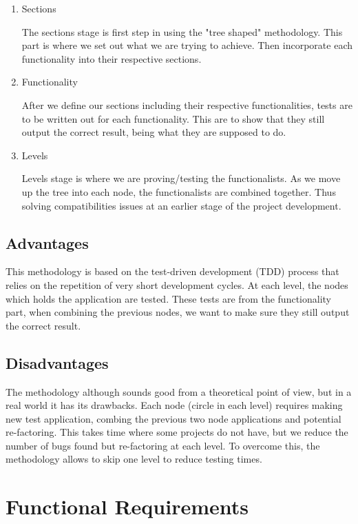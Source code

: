 \begin{enumerate}
  \item Sections
  
    The sections stage is first step in using the "tree shaped" methodology. This part is where we set out what we are trying to achieve. Then incorporate each functionality into their respective sections.
    
  \item Functionality   
    
     After we define our sections including their respective functionalities, tests are to be written out for each functionality. This are to show that they still output the correct result, being what they are supposed to do.
    
  \item Levels
  
    Levels stage is where we are proving/testing the functionalists. As we move up the tree into each node, the functionalists are combined together. Thus solving compatibilities issues at an earlier stage of the project development.
\end{enumerate}

\subsection{Advantages}

This methodology is based on the test-driven development (TDD) process that relies on the repetition of very short development cycles. At each level, the nodes which holds the application are tested. These tests are from the functionality part, when combining the previous nodes, we want to make sure they still output the correct result.

\subsection{Disadvantages}

The methodology although sounds good from a theoretical point of view, but in a real world it has its drawbacks. Each node (circle in each level) requires making new test application, combing the previous two node applications and potential re-factoring. This takes time where some projects do not have, but we reduce the number of bugs found but re-factoring at each level. To overcome this, the methodology allows to skip one level to reduce testing times.

\section{Functional Requirements}

